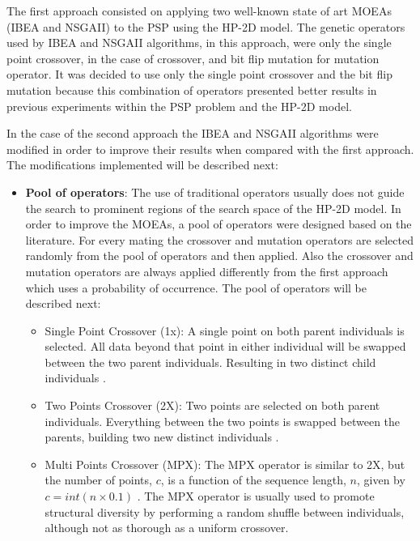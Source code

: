 The first approach consisted on applying two well-known state of art MOEAs (IBEA and NSGAII) to the PSP using the HP-2D model. The genetic operators used by IBEA and NSGAII algorithms, in this approach, were only the single point crossover, in the case of crossover, and bit flip mutation for mutation operator. It was decided to use only the single point crossover and the bit flip mutation because this combination of operators presented better results in previous experiments within the PSP problem and the HP-2D model.

In the case of the second approach the IBEA and NSGAII algorithms were modified in order to improve their results when compared with the first approach. The modifications implemented will be described next:

\begin{itemize}
	
	\item \textbf{Pool of operators}: The use of traditional operators usually does not guide the search to prominent regions of the search space of the HP-2D model. In order to improve the MOEAs, a pool of operators were designed based on the literature. For every mating the crossover and mutation operators are selected randomly from the pool of operators and then applied. Also the crossover and mutation operators are always applied differently from the first approach which uses a probability of occurrence. The pool of operators will be described next:
	
	\begin{itemize}
		\item Single Point Crossover (1x): A single point on both parent individuals is selected. All data beyond that point in either individual will be swapped between the two parent individuals. Resulting in two distinct child individuals \cite{holland1975adaptation}.
		
		\item Two Points Crossover (2X): Two points are selected on both parent individuals. Everything between the two points is swapped between the parents, building two new distinct individuals \cite{holland1975adaptation}.
		
		\item Multi Points Crossover (MPX): The MPX operator is similar to 2X, but the number of points, $c$, is a function of the sequence length, $n$, given by $c = int(n \times 0.1)$ \cite{custodio2004investigation}. The MPX operator is usually used to promote structural diversity by performing a random shuffle between individuals, although not as thorough as a uniform crossover.
		

\end{itemize}
\end{itemize}
